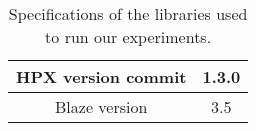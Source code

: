 \vspace{\baselineskip}	
\begin{table}[H]
	\centering
	\scalebox{0.75}
	{\begin{tabular}{|c | c |} 
			\hline
			HPX version commit & 1.3.0 \\ [0.5ex] 
			\hline
			Blaze version & 3.5\\ 	
			\hline
			
	\end{tabular}}	
	\caption{Specifications of the libraries used to run our experiments.}
	\label{table5}
\end{table}
%
%
%
%
%
%



